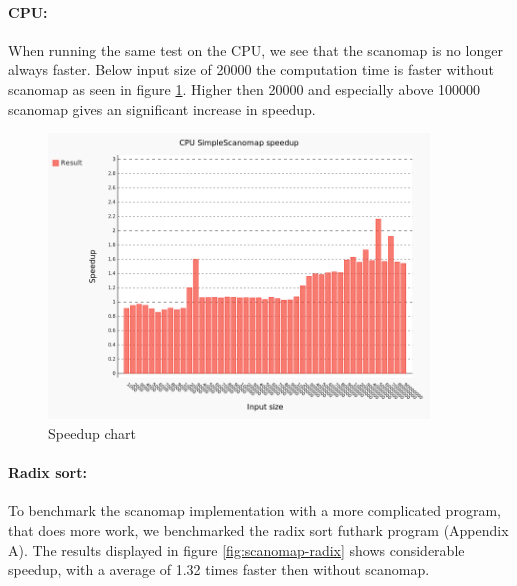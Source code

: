 \documentclass[11pt]{article}
\begin{document}
\paragraph*{CPU:} When running the same test on the CPU, we see that the scanomap is no longer always faster. Below input size of 20000 the computation time is faster without scanomap as seen in figure \ref{fig:CPU-map-scan fusion speedup}. Higher then 20000 and especially above 100000 scanomap gives an significant increase in speedup.

\begin{figure}[h!]
  \centering
    \includegraphics[width=0.9\textwidth]{images/futhark-c-comparing.png}
  \caption{Speedup chart}
  \label{fig:CPU-map-scan fusion speedup}
\end{figure}

\paragraph*{Radix sort:}

To benchmark the scanomap implementation with a more complicated program, that does more work, we benchmarked the radix sort futhark program (Appendix A). The results displayed in figure \ref{fig:scanomap-radix} shows considerable speedup, with a average of 1.32 times faster then without scanomap.
\end{document}
